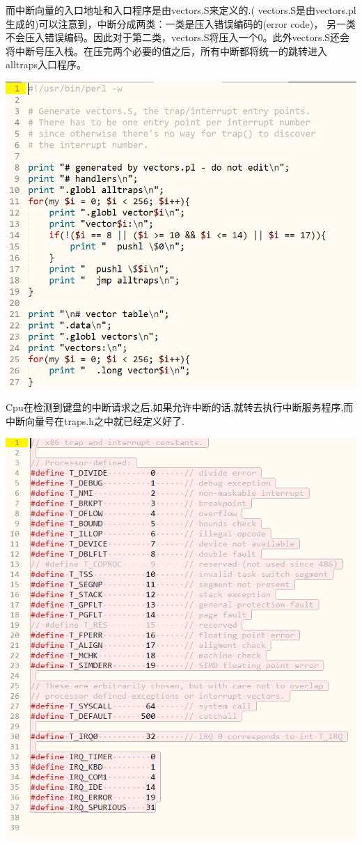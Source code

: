 而中断向量的入口地址和入口程序是由vectors.S来定义的.( vectors.S是由vectors.pl生成的)可以注意到，中断分成两类：一类是压入错误编码的(error code)， 另一类不会压入错误编码。因此对于第二类，vectors.S将压入一个0。此外vectors.S还会将中断号压入栈。在压完两个必要的值之后，所有中断都将统一的跳转进入alltraps入口程序。

\includegraphics[width=6in]{figures/input/image5.png}

Cpu在检测到键盘的中断请求之后,如果允许中断的话,就转去执行中断服务程序,而中断向量号在traps.h之中就已经定义好了.

\includegraphics[width=6in]{figures/input/image6.png}

